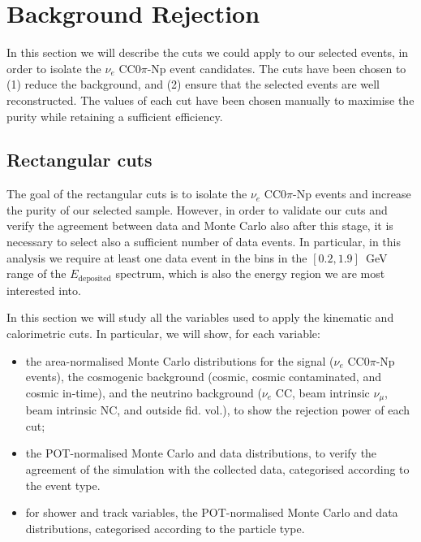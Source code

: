 \section{Background Rejection}\label{sec:bkg}
In this section we will describe the cuts we could apply to our selected events, in order to isolate the $\nu_{e}$ CC$0\pi$-Np event candidates. The cuts have been chosen to (1) reduce the background, and (2) ensure that the selected events are well reconstructed. The values of each cut have been chosen manually to maximise the purity while retaining a sufficient efficiency. %


\subsection{Rectangular cuts}\label{sec:cuts}
The goal of the rectangular cuts is to isolate the $\nu_e$ CC0$\pi$-Np events and increase the purity of our selected sample. However, in order to validate our cuts and verify the agreement between data and Monte Carlo also after this stage, it is necessary to select also a sufficient number of data events. In particular, in this analysis we require at least one data event in the bins in the $[0.2,1.9]$~GeV range of the $E_{\mathrm{deposited}}$ spectrum, which is also the energy region we are most interested into. 

In this section we will study all the variables used to apply the kinematic and calorimetric cuts. In particular, we will show, for each variable:
\begin{itemize}
\item the area-normalised Monte Carlo distributions for the signal ($\nu_{e}$ CC0$\pi$-Np events), the cosmogenic background (cosmic, cosmic contaminated, and cosmic in-time), and the neutrino background ($\nu_{e}$ CC, beam intrinsic $\nu_{\mu}$, beam intrinsic NC, and outside fid. vol.), to show the rejection power of each cut;
\item the POT-normalised Monte Carlo and data distributions, to verify the agreement of the simulation with the collected data, categorised according to the event type.
\item for shower and track variables, the POT-normalised Monte Carlo and data distributions, categorised according to the particle type.
\end{itemize}

